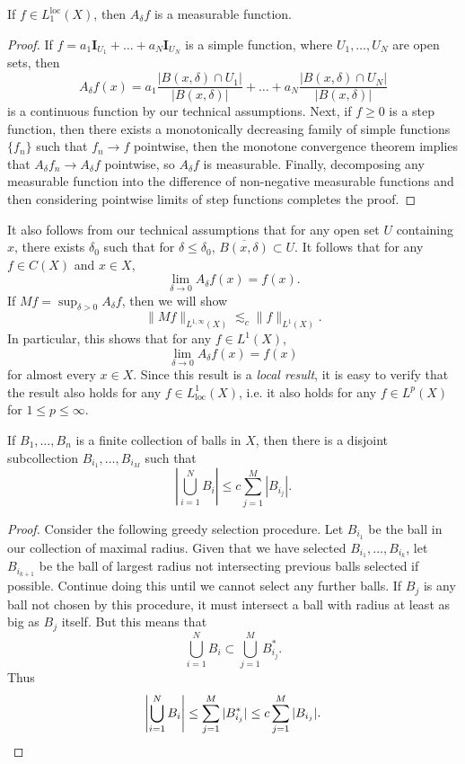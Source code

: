 \begin{lemma}
  If $f \in L_1^{\text{loc}}(X)$, then $A_\delta f$ is a measurable function.
\end{lemma}
\begin{proof}
  If $f = a_1 \mathbf{I}_{U_1} + \dots + a_N \mathbf{I}_{U_N}$ is a simple function, where $U_1,\dots,U_N$ are open sets, then
  \[ A_\delta f(x) = a_1 \frac{|B(x,\delta) \cap U_1|}{|B(x,\delta)|} + \dots + a_N \frac{|B(x,\delta) \cap U_N|}{|B(x,\delta)|} \]
  is a continuous function by our technical assumptions. Next, if $f \geq 0$ is a step function, then there exists a monotonically decreasing family of simple functions $\{ f_n \}$ such that $f_n \to f$ pointwise, then the monotone convergence theorem implies that $A_\delta f_n \to A_\delta f$ pointwise, so $A_\delta f$ is measurable. Finally, decomposing any measurable function into the difference of non-negative measurable functions and then considering pointwise limits of step functions completes the proof.
\end{proof}

It also follows from our technical assumptions that for any open set $U$ containing $x$, there exists $\delta_0$ such that for $\delta \leq \delta_0$, $\overline{B(x,\delta)} \subset U$. It follows that for any $f \in C(X)$ and $x \in X$,
%
\begin{equation} \label{pointwiseaverageconvergence}
  \lim_{\delta \to 0} A_\delta f(x) = f(x).
\end{equation}
%
If $Mf = \sup_{\delta > 0} A_\delta f$, then we will show
%
\[ \| Mf \|_{L^{1,\infty}(X)} \lesssim_c \| f \|_{L^1(X)}. \]
%
In particular, this shows that for any $f \in L^1(X)$,
%
\[ \lim_{\delta \to 0} A_\delta f(x) = f(x) \]
%
for almost every $x \in X$. Since this result is a \emph{local result}, it is easy to verify that the result also holds for any $f \in L^1_{\text{loc}}(X)$, i.e. it also holds for any $f \in L^p(X)$ for $1 \leq p \leq \infty$.

\begin{lemma}
    If $B_1, \dots, B_n$ is a finite collection of balls in $X$, then there is a disjoint subcollection $B_{i_1}, \dots, B_{i_M}$ such that
    \[ \left| \bigcup_{i = 1}^N B_i \right| \leq c \sum_{j = 1}^M |B_{i_j}|. \]
\end{lemma}
\begin{proof}
  Consider the following greedy selection procedure. Let $B_{i_1}$ be the ball in our collection of maximal radius. Given that we have selected $B_{i_1},\dots,B_{i_k}$, let $B_{i_{k+1}}$ be the ball of largest radius not intersecting previous balls selected if possible. Continue doing this until we cannot select any further balls. If $B_j$ is any ball not chosen by this procedure, it must intersect a ball with radius at least as big as $B_j$ itself. But this means that
  \[ \bigcup_{i = 1}^N B_i \subset \bigcup_{j = 1}^M B^*_{i_j}. \]
  Thus
  \[ \left| \bigcup_{i = 1}^N B_i \right| \leq \sum_{j = 1}^M |B^*_{i_j}| \leq c \sum_{j = 1}^M |B_{i_j}|. \qedhere \]
\end{proof}

